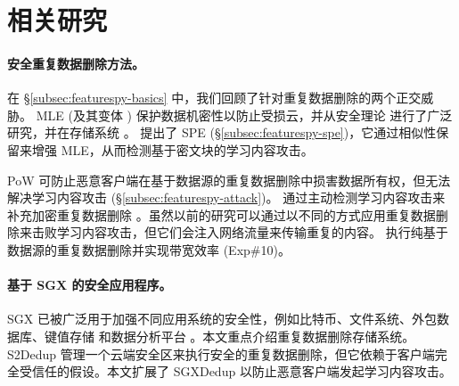 \section{相关研究}
\label{sec:featurespy-related-work}

\paragraph*{安全重复数据删除方法。}
在 \S\ref{subsec:featurespy-basics} 中，我们回顾了针对重复数据删除的两个正交威胁。 MLE (及其变体 \cite{bellare13a, bellare13b, douceur02, li15}) 保护数据机密性以防止受损云，并从安全理论 \cite{bellare15, abadi13} 进行了广泛研究，并在存储系统 \cite{cox02, adya02, bellare13b, armknecht15, shah15, li15, li19, qin17, li20a, ren21}。 \sysnameF 提出了 SPE (\S\ref{subsec:featurespy-spe})，它通过相似性保留来增强 MLE，从而检测基于密文块的学习内容攻击。


PoW 可防止恶意客户端在基于数据源的重复数据删除中损害数据所有权，但无法解决学习内容攻击 (\S\ref{subsec:featurespy-attack})。 \sysnameF 通过主动检测学习内容攻击来补充加密重复数据删除 \cite{ren21}。虽然以前的研究可以通过以不同的方式应用重复数据删除来击败学习内容攻击，但它们会注入网络流量来传输重复的内容。 \sysnameF 执行纯基于数据源的重复数据删除并实现带宽效率 (Exp\#10)。


\paragraph*{基于 SGX 的安全应用程序。}
SGX 已被广泛用于加强不同应用系统的安全性，例如比特币\cite{matetic19}、文件系统\cite{ahmad18,shinde20}、外包数据库\cite{eskandarian17,priebe18,sun21}、键值存储\cite{mishra18,bailleu19,kim19,bailleu21} 和数据分析平台 \cite{schuster15, zheng17, bowe20}。本文重点介绍重复数据删除存储系统。 S2Dedup \cite{miranda21} 管理一个云端安全区来执行安全的重复数据删除，但它依赖于客户端完全受信任的假设。本文扩展了 SGXDedup \cite{ren21} 以防止恶意客户端发起学习内容攻击。